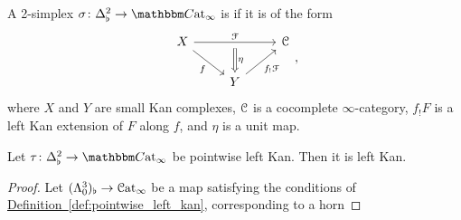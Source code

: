 \documentclass[main.tex]{subfiles}
\begin{document}
\begin{definition}
  \label{def:pointwise_left_kan}
  A 2-simplex $\sigma\colon \Delta^{2}_{\flat} \to \ICCat$ is  if it is of the form
  \begin{equation*}
    \begin{tikzcd}
      X
      \arrow[rr, "\mathcal{F}", ""{below, name=M}]
      \arrow[dr, swap, "f"]
      && \category{C}
      \\
      & Y
      \arrow[ur, swap, "f_{!}\mathcal{F}"]
      \arrow[from=M, Rightarrow, "\eta"]
    \end{tikzcd},
  \end{equation*}
  where $X$ and $Y$ are small Kan complexes, $\mathcal{C}$ is a cocomplete $\infty$-category, $f_{!}F$ is a left Kan extension of $F$ along $f$, and $\eta$ is a unit map.
\end{definition}

\begin{proposition}
  Let $\tau\colon \Delta^{2}_{\flat} \to \ICCat$ be pointwise left Kan. Then it is left Kan.
\end{proposition}
\begin{proof}
  Let $(\Lambda^{3}_{0})_{\flat} \to \mathcal{C}\mathrm{at}_{\infty}$ be a map satisfying the conditions of \hyperref[def:pointwise_left_kan]{Definition~\ref*{def:pointwise_left_kan}}, corresponding to a horn
\end{proof}
\end{document}
